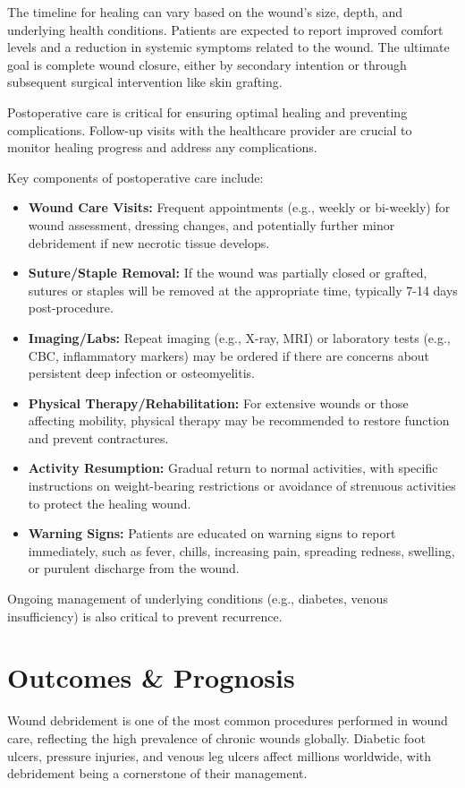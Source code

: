 The timeline for healing can vary based on the wound's size, depth, and underlying health conditions. Patients are expected to report improved comfort levels and a reduction in systemic symptoms related to the wound. The ultimate goal is complete wound closure, either by secondary intention or through subsequent surgical intervention like skin grafting.

Postoperative care is critical for ensuring optimal healing and preventing complications. Follow-up visits with the healthcare provider are crucial to monitor healing progress and address any complications. 

Key components of postoperative care include:

\begin{itemize}
  \item \textbf{Wound Care Visits:} Frequent appointments (e.g., weekly or bi-weekly) for wound assessment, dressing changes, and potentially further minor debridement if new necrotic tissue develops.
  \item \textbf{Suture/Staple Removal:} If the wound was partially closed or grafted, sutures or staples will be removed at the appropriate time, typically 7-14 days post-procedure.
  \item \textbf{Imaging/Labs:} Repeat imaging (e.g., X-ray, MRI) or laboratory tests (e.g., CBC, inflammatory markers) may be ordered if there are concerns about persistent deep infection or osteomyelitis.
  \item \textbf{Physical Therapy/Rehabilitation:} For extensive wounds or those affecting mobility, physical therapy may be recommended to restore function and prevent contractures.
  \item \textbf{Activity Resumption:} Gradual return to normal activities, with specific instructions on weight-bearing restrictions or avoidance of strenuous activities to protect the healing wound.
  \item \textbf{Warning Signs:} Patients are educated on warning signs to report immediately, such as fever, chills, increasing pain, spreading redness, swelling, or purulent discharge from the wound.
\end{itemize}

Ongoing management of underlying conditions (e.g., diabetes, venous insufficiency) is also critical to prevent recurrence.

\section*{Outcomes \& Prognosis}
Wound debridement is one of the most common procedures performed in wound care, reflecting the high prevalence of chronic wounds globally. Diabetic foot ulcers, pressure injuries, and venous leg ulcers affect millions worldwide, with debridement being a cornerstone of their management. 

